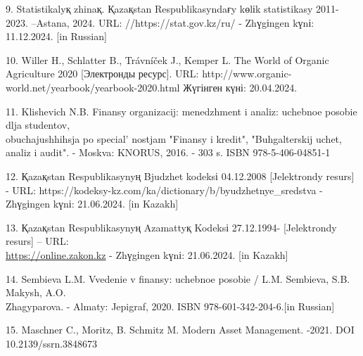 \begin{references}
9. Statistikalyқ zhinaқ. Қazaқstan Respublikasyndaғy kөlіk statistikasy
2011-2023. --Astana, 2024. URL: //https://stat.gov.kz/ru/ - Zhүgіngen
kүnі: 11.12.2024. {[}in Russian{]}

10. Willer H., Schlatter B., Trávníček J., Kemper L. The World of Organic
Agriculture 2020 {[}Электронды ресурс{]}. URL:
http://www.organic-world.net/yearbook/yearbook-2020.html Жүгінген күні:
20.04.2024.

11. Klishevich N.B. Finansy organizacij: menedzhment i analiz: uchebnoe
posobie dlja studentov, \\obuchajushhihsja po
special' nostjam "Finansy i kredit", "Buhgalterskij
uchet, analiz i audit". - Moskva: KNORUS, 2016. - 303 s. ISBN
978-5-406-04851-1

12. Қazaқstan Respublikasynyң Bjudzhet kodeksі 04.12.2008 {[}Jelektrondy
resurs{]} - URL:
https://kodeksy-kz.com/ka/dictionary/b/byudzhetnye\_sredstva - Zhүgіngen
kүnі: 21.06.2024. {[}in Kazakh{]}

13. Қazaқstan Respublikasynyң Azamattyқ Kodeksі 27.12.1994-
{[}Jelektrondy resurs{]} -- URL:\\
\href{https://online.zakon.kz/Document/?doc\_id=51006061}{https://online.zakon.kz}
- Zhүgіngen kүnі: 21.06.2024. {[}in Kazakh{]}

14. Sembieva L.M. Vvedenie v finansy: uchebnoe posobie / L.M. Sembieva,
S.B. Makysh, A.O. \\Zhagyparova. - Almaty: Jepigraf, 2020. ISBN
978-601-342-204-6.{[}in Russian{]}

15. Maschner C., Moritz, B. Schmitz M. Modern Asset Management. -2021.
DOI 10.2139/ssrn.3848673
\end{references}

